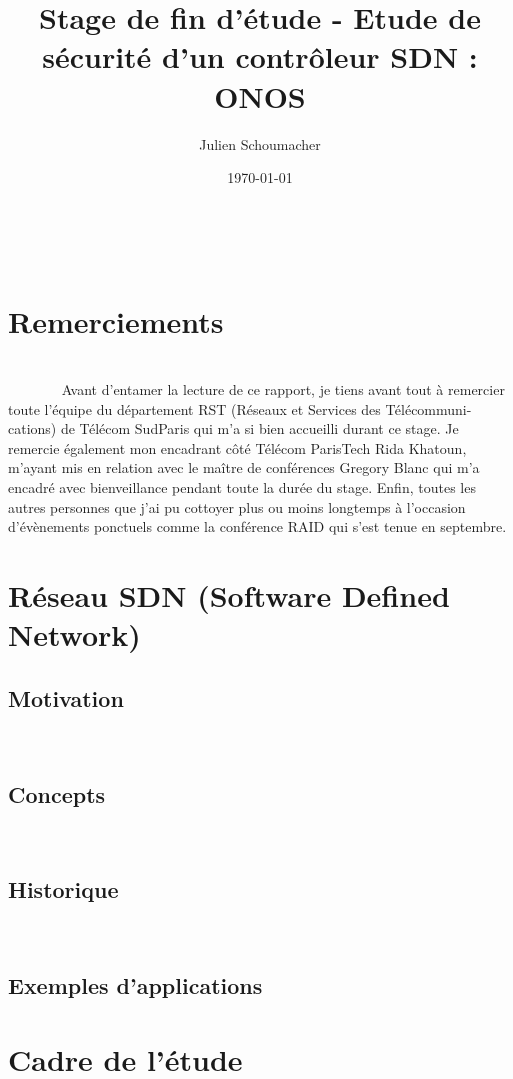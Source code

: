 \documentclass[11pt]{article}
\title{Stage de fin d'étude - Etude de sécurité d'un contrôleur SDN : ONOS}
\author{Julien Schoumacher}
\date{\today}
\begin{document}


\newpage
{\large ~\\}
\section*{\Huge{Remerciements}}
~\\
{\Large~~~~~~~
Avant d'entamer la lecture de ce rapport, je tiens avant tout à remercier toute l'équipe du département RST (Réseaux et Services des Télécommuni-cations) de Télécom SudParis qui m'a si bien accueilli durant ce stage. Je remercie également mon encadrant côté Télécom ParisTech Rida Khatoun, m'ayant mis en relation avec le maître de conférences Gregory Blanc qui m'a encadré avec bienveillance pendant toute la durée du stage. Enfin, toutes les autres personnes que j'ai pu cottoyer plus ou moins longtemps à l'occasion d'évènements ponctuels comme la conférence RAID qui s'est tenue en septembre.}

\newpage
\tableofcontents


\newpage
{}
\section{Réseau SDN (Software Defined Network)}
	\subsection{Motivation}
		
		~\\
	\subsection{Concepts}
		
		~\\
	\subsection{Historique}
		
		~\\
	\subsection{Exemples d'applications}
		
\newpage
{}
\section{Cadre de l'étude}
\end{document}
